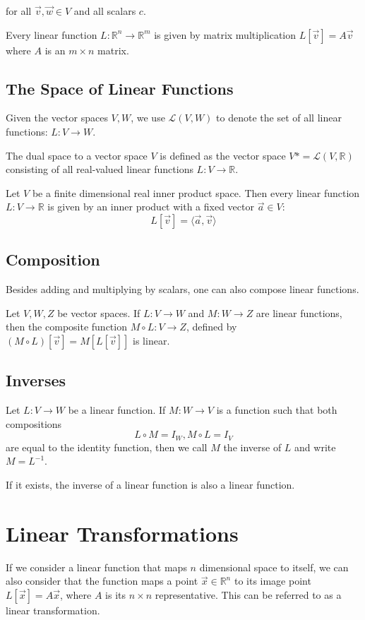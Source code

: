 for all $\vec{v}, \vec{w} \in V$ and all scalars $c$.

Every linear function $L: \mathbb{R}^n \to \mathbb{R}^m$ is given by matrix multiplication $L[\vec{v}] = A \vec{v}$ where $A$ is an $m \times n$ matrix.

    \subsection{The Space of Linear Functions}
    Given the vector spaces $V, W$, we use $\mathcal{L}(V,W)$ to denote the set of all linear functions: $L:V \to W$.

    The dual space to a vector space $V$ is defined as the vector space $V* = \mathcal{L}(V, \mathbb{R})$ consisting of all real-valued linear functions $L: V \to \mathbb{R}$.

    Let $V$ be a finite dimensional real inner product space. Then every linear function $L:V \to \mathbb{R}$ is given by an inner product with a fixed vector $\vec{a} \in V$:
    \[ L[\vec{v}] = \langle \vec{a}, \vec{v} \rangle \]

    \subsection{Composition}
    Besides adding and multiplying by scalars, one can also compose linear functions.

    Let $V, W, Z$ be vector spaces. If $L:V \to W$ and $M:W \to Z$ are linear functions, then the composite function $M \circ L:V \to Z$, defined by $(M \circ L)[\vec{v}] = M[L[\vec{v}]]$ is linear.

    \subsection{Inverses}
    Let $L:V \to W$ be a linear function. If $M: W \to V$ is a function such that both compositions
        \[ L \circ M = I_W, M \circ L = I_V \]
    are equal to the identity function, then we call $M$ the inverse of $L$ and write $M = L^{-1}$.

    If it exists, the inverse of a linear function is also a linear function.

\section{Linear Transformations}
If we consider a linear function that maps $n$ dimensional space to itself, we can also consider that the function maps a point $\vec{x} \in \mathbb{R}^n$ to its image point $L[\vec{x}] = A \vec{x}$, where $A$ is its $n \times n$ representative. This can be referred to as a linear transformation.


